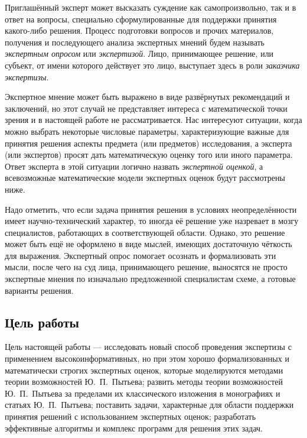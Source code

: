 Приглашённый эксперт может высказать суждение как самопроизвольно, так и в ответ на вопросы, специально сформулированные для поддержки принятия какого-либо решения. Процесс подготовки вопросов и прочих материалов, получения и последующего анализа экспертных мнений будем называть {\sl экспертным опросом} или {\sl экспертизой}. Лицо, принимающее решение, или субъект, от имени которого действует это лицо, выступает здесь в роли {\sl заказчика экспертизы}.
 
Экспертное мнение может быть выражено в виде развёрнутых рекомендаций и заключений, но этот случай не представляет интереса с математической точки зрения и в настоящей работе не рассматривается. Нас интересуют ситуации, когда можно выбрать некоторые числовые параметры, характеризующие важные для принятия решения аспекты предмета (или предметов) исследования, а эксперта (или экспертов) просят дать математическую оценку того или иного параметра. Ответ эксперта в этой ситуации логично назвать {\sl экспертной оценкой}, а всевозможные математические модели экспертных оценок будут рассмотрены ниже.  
 
Надо отметить, что если задача принятия решения в условиях неопределённости имеет научно-технический характер, то иногда её решение уже назревает в мозгу специалистов, работающих в соответствующей области. Однако, это решение может быть ещё не оформлено в виде мыслей, имеющих достаточную чёткость для выражения. Экспертный опрос помогает осознать и формализовать эти мысли, после чего на суд лица, принимающего решение, выносятся не просто экспертные мнения по изначально предложенной специалистам схеме, а готовые варианты решения. 

\subsection{Цель работы}
Цель настоящей работы --- исследовать новый способ проведения экспертизы с применением высокоинформативных, но при этом хорошо формализованных и математически строгих экспертных оценок, которые моделируются методами теории возможностей Ю.~П.~Пытьева; развить методы теории возможностей Ю.~П.~Пытьева за пределами их классического изложения в монографиях и статьях Ю.~П.~Пытьева; поставить задачи, характерные для области поддержки принятия решений с использованием экспертных оценок; разработать эффективные алгоритмы и комплекс программ для решения этих задач. 

